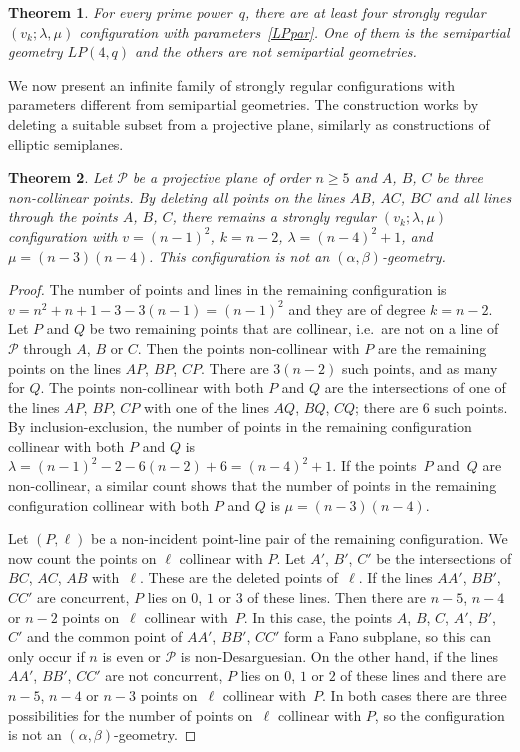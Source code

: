 \documentclass[12pt, reqno]{amsart}
\newtheorem{theorem}{Theorem}[section]
\def\P{\mathcal{P}}
\begin{document}
\begin{theorem}\label{LPtransformed}
For every prime power~$q$, there are at least four strongly regular $(v_k;\lambda,\mu)$ configuration
with parameters~\eqref{LPpar}. One of them is the semipartial geometry $LP(4,q)$ and the others are
not semipartial geometries.
\end{theorem}

We now present an infinite family of strongly regular configurations with parameters
different from semipartial geometries. The construction works by deleting a
suitable subset from a projective plane, similarly as constructions of elliptic
semiplanes.

\begin{theorem}\label{triangle}
Let $\P$ be a projective plane of order $n\ge 5$ and $A$, $B$, $C$
be three non-collinear points. By deleting all points on the lines
$AB$, $AC$, $BC$ and all lines through the points $A$, $B$, $C$, there
remains a strongly regular $(v_k;\lambda,\mu)$ configuration with $v=(n-1)^2$, $k=n-2$,
$\lambda=(n-4)^2+1$, and $\mu=(n-3)(n-4)$. This configuration is not an
$(\alpha,\beta)$-geometry.
\end{theorem}

\begin{proof}
The number of points and lines in the remaining configuration is
$v=n^2+n+1-3-3(n-1)=(n-1)^2$ and they are of degree $k=n-2$. Let
$P$ and $Q$ be two remaining points that are collinear, i.e.\
are not on a line of $\P$ through $A$, $B$ or $C$. Then the points
non-collinear with $P$ are the remaining points on the
lines $AP$, $BP$, $CP$. There are $3(n-2)$ such points, and as many
for $Q$. The points non-collinear with both $P$ and $Q$ are
the intersections of one of the lines $AP$, $BP$, $CP$ with one of
the lines $AQ$, $BQ$, $CQ$; there are $6$ such points. By
inclusion-exclusion, the number of points in the remaining
configuration collinear with both $P$ and $Q$ is $\lambda=(n-1)^2-2
-6(n-2)+6=(n-4)^2+1$. If the points~$P$ and~$Q$
are non-collinear, a similar count shows that the number of
points in the remaining configuration collinear with both $P$ and $Q$ is
$\mu=(n-3)(n-4)$.

Let $(P,\ell)$ be a non-incident point-line pair of the remaining
configuration. We now count the points on $\ell$ collinear with $P$.
Let $A'$, $B'$, $C'$ be the intersections of $BC$, $AC$, $AB$ with~$\ell$.
These are the deleted points of~$\ell$. If the lines $AA'$, $BB'$, $CC'$
are concurrent, $P$ lies on $0$, $1$ or $3$ of these lines. Then there are
$n-5$, $n-4$ or $n-2$ points on~$\ell$ collinear with~$P$. In this case, the points
$A$, $B$, $C$, $A'$, $B'$, $C'$ and the common point of $AA'$, $BB'$, $CC'$
form a Fano subplane, so this can only occur if $n$ is even or $\P$ is non-Desarguesian.
On the other hand, if the lines $AA'$, $BB'$, $CC'$
are not concurrent, $P$ lies on $0$, $1$ or $2$ of these lines and there are
$n-5$, $n-4$ or $n-3$ points on~$\ell$ collinear with~$P$. In both cases there are three
possibilities for the number of points on~$\ell$ collinear with $P$, so the configuration
is not an $(\alpha,\beta)$-geometry.
\end{proof}
\end{document}
